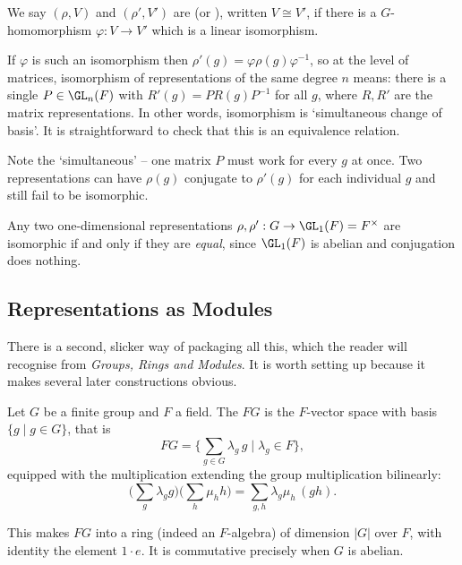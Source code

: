 \begin{definition}
	We say $(\rho, V)$ and $(\rho', V')$ are  (or ), written $V \cong V'$, if there is a $G$-homomorphism $\varphi : V \to V'$ which is a linear isomorphism.
\end{definition}

If $\varphi$ is such an isomorphism then $\rho'(g) = \varphi \rho(g) \varphi^{-1}$, so at the level of matrices, isomorphism of representations of the same degree $n$ means: there is a single $P \in \GL_n(F)$ with $R'(g) = P R(g) P^{-1}$ for all $g$, where $R, R'$ are the matrix representations. In other words, isomorphism is `simultaneous change of basis'. It is straightforward to check that this is an equivalence relation.

\begin{remark}
	Note the `simultaneous' -- one matrix $P$ must work for every $g$ at once. Two representations can have $\rho(g)$ conjugate to $\rho'(g)$ for each individual $g$ and still fail to be isomorphic.
\end{remark}

\begin{example}
	Any two one-dimensional representations $\rho, \rho' : G \to \GL_1(F) = F^\times$ are isomorphic if and only if they are \emph{equal}, since $\GL_1(F)$ is abelian and conjugation does nothing.
\end{example}

\subsection{Representations as Modules}

There is a second, slicker way of packaging all this, which the reader will recognise from \emph{Groups, Rings and Modules}. It is worth setting up because it makes several later constructions obvious.

\begin{definition}
	Let $G$ be a finite group and $F$ a field. The  $FG$ is the $F$-vector space with basis $\{ g \mid g \in G\}$, that is
	$$FG = \Big\{ \sum_{g \in G} \lambda_g \, g \; \Big| \; \lambda_g \in F \Big\},$$
	equipped with the multiplication extending the group multiplication bilinearly:
	$$\Big(\sum_g \lambda_g g\Big)\Big(\sum_h \mu_h h\Big) = \sum_{g,h} \lambda_g \mu_h \, (gh).$$
\end{definition}

This makes $FG$ into a ring (indeed an $F$-algebra) of dimension $|G|$ over $F$, with identity the element $1 \cdot e$. It is commutative precisely when $G$ is abelian.

